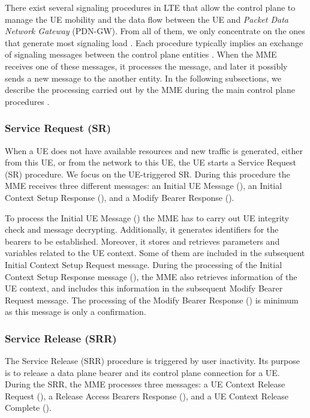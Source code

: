 \documentclass[conference]{IEEEtran}
\begin{document}
There exist several signaling procedures in LTE that allow the control plane to manage the UE mobility and the data flow between the UE and \emph{Packet Data Network Gateway} (PDN-GW). From all of them, we only concentrate on the ones that generate most signaling load \cite{Hirschman15}. Each procedure typically implies an exchange of signaling messages between the control plane entities \cite{lte-signaling}. When the MME receives one of these messages, it processes the message, and later it possibly sends a new message to the another entity. In the following subsections, we describe the processing carried out by the MME during the main control plane procedures \cite{lte-signaling}.

 
\subsubsection{Service Request (SR)}
 
When a UE does not have  available resources and new traffic is generated, either from this UE, or from the network to this UE, the UE starts a Service Request (SR) procedure. We focus on the UE-triggered SR. During this procedure the MME receives three different messages: an Initial UE Message (), an Initial Context Setup Response (), and a Modify Bearer Response ().



To process the Initial UE Message () the MME has to carry out UE integrity check and message decrypting. Additionally, it generates identifiers for the bearers to be established. Moreover, it stores and retrieves parameters and variables related to the UE context. Some of them are included in the subsequent Initial Context Setup Request message. During the processing of the Initial Context Setup Response message (), the MME also retrieves information of the UE context, and includes this information in the subsequent Modify Bearer Request message. The processing of the Modify Bearer Response () is minimum as this message is only a confirmation.

   
 
\subsubsection{Service Release (SRR)}
 
The Service Release (SRR) procedure is triggered by user inactivity. Its purpose is to release a data plane bearer and its control plane connection for a UE. During the SRR, the MME processes three messages: a UE Context Release Request (), a Release Access Bearers Response (), and a UE Context Release Complete ().
  
\end{document}

